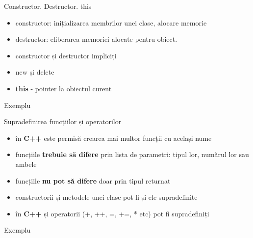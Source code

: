 \documentclass{beamer}
\begin{document}
\begin{frame}{Constructor. Destructor. this}
  \begin{itemize}
  \item constructor: inițializarea membrilor unei clase, alocare memorie
  \item destructor: eliberarea memoriei alocate pentru obiect.
  \item constructor și destructor impliciți
  \item new și delete 
  \item \textbf{this} - pointer la obiectul curent
  \end{itemize}
\end{frame}
             
\begin{frame}{Exemplu}
  \footnotesize{}
\end{frame} 


\begin{frame}{Supradefinirea funcțiilor și operatorilor}
  \begin{itemize}
  \item în \textbf{C++} este permisă crearea mai multor funcții cu același nume 
  \item funcțiile \textbf{trebuie să difere} prin lista de parametri: tipul lor, numărul lor sau ambele
  \item funcțiile \textbf{nu pot să difere} doar prin tipul returnat
  \item constructorii și metodele unei clase pot fi și ele supradefinite
  \item în \textbf{C++} și operatorii (+, ++, =, +=, * etc) pot fi supradefiniți
  \end{itemize}
\end{frame}

\begin{frame}{Exemplu}
  \footnotesize{}
\end{frame}
\end{document}
